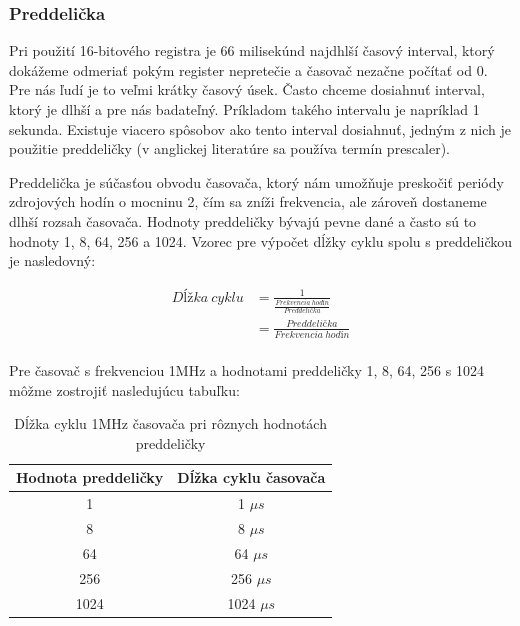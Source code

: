 \subsubsection{Preddelička}

Pri použití 16-bitového registra je 66 milisekúnd najdhlší časový interval, ktorý dokážeme odmeriať pokým register nepretečie a časovač nezačne počítať od 0.
Pre nás ľudí je to veľmi krátky časový úsek. Často chceme dosiahnuť interval, ktorý je dlhší a pre nás badateľný. Príkladom takého intervalu je  napríklad 1 sekunda.
Existuje viacero spôsobov ako tento interval dosiahnuť, jedným z nich je použitie preddeličky (v anglickej literatúre sa používa termín prescaler).
\par
Preddelička je súčasťou obvodu časovača, ktorý nám umožňuje preskočiť periódy zdrojových hodín o mocninu 2, čím sa zníži frekvencia,
ale zároveň dostaneme dlhší rozsah časovača.
Hodnoty preddeličky bývajú pevne dané a často sú to hodnoty 1, 8, 64, 256 a 1024. Vzorec pre výpočet dĺžky cyklu spolu s preddeličkou je nasledovný:

\begin{equation} \label{eq:cycle-length}
    \begin{aligned}
        Dĺžka\:cyklu & = \frac{1}{\frac{Frekvencia\:hodín}{Preddelička}} \\
                     & = \frac{Preddelička}{Frekvencia\:hodín}           \\
    \end{aligned}
\end{equation}

Pre časovač s frekvenciou 1MHz a hodnotami preddeličky 1, 8, 64, 256 s 1024 môžme zostrojiť nasledujúcu tabuľku:
\begin{table}[!htbp]
    \begin{center}
        \begin{tabular}{|c|c|}
            \hline
            Hodnota preddeličky & Dĺžka cyklu časovača \\
            \hline
            1                   & 1 $\mu s$            \\
            8                   & 8 $\mu s$            \\
            64                  & 64 $\mu s$           \\
            256                 & 256 $\mu s$          \\
            1024                & 1024 $\mu s$         \\
            \hline
        \end{tabular}
        \caption{Dĺžka cyklu 1MHz časovača pri rôznych hodnotách preddeličky}
        \label{table:timerPrescaler}
    \end{center}
\end{table}


